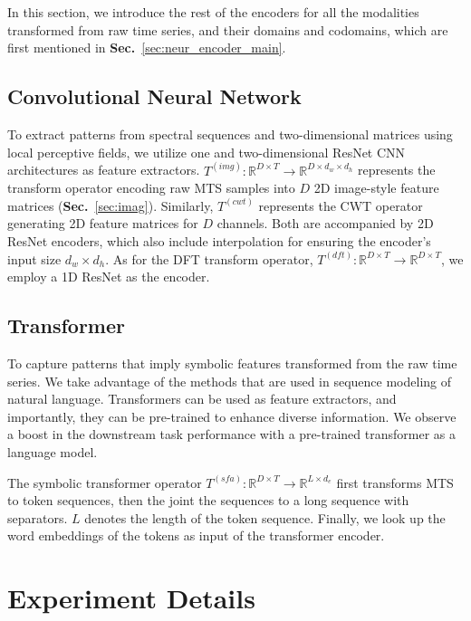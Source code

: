 In this section, we introduce the rest of the encoders for all the modalities transformed from raw time series, and their domains and codomains, which are first mentioned in \textbf{Sec.}~\ref{sec:neur_encoder_main}.

\subsection{Convolutional Neural Network}

To extract patterns from spectral sequences and two-dimensional matrices using local perceptive fields, we utilize one and two-dimensional ResNet CNN architectures as feature extractors. $T^{(img)}: \mathbb{R}^{D\times T} \to \mathbb{R}^{D \times d_w \times d_h}$ represents the transform operator encoding raw MTS samples into $D$ 2D image-style feature matrices (\textbf{Sec.}~\ref{sec:imag}). Similarly, $T^{(cwt)}$ represents the CWT operator generating 2D feature matrices for $D$ channels. Both are accompanied by 2D ResNet encoders, which also include interpolation for ensuring the encoder's input size $d_w \times d_h$. As for the DFT transform operator, $T^{(dft)}: \mathbb{R}^{D\times T} \to \mathbb{R}^{D \times T}$, we employ a 1D ResNet as the encoder.

\subsection{Transformer}

To capture patterns that imply symbolic features transformed from the raw time series. We take advantage of the methods that are used in sequence modeling of natural language. Transformers can be used as feature extractors, and importantly, they can be pre-trained to enhance diverse information. We observe a boost in the downstream task performance with a pre-trained transformer as a language model. 

The symbolic transformer operator $T^{(sfa)}: \mathbb{R}^{D\times T} \to \mathbb{R}^{L \times d_e}$ first transforms MTS to token sequences, then the joint the sequences to a long sequence with separators. $L$ denotes the length of the token sequence. Finally, we look up the word embeddings of the tokens as input of the transformer encoder.



\section{Experiment Details}\label{sec:exp_detail}

